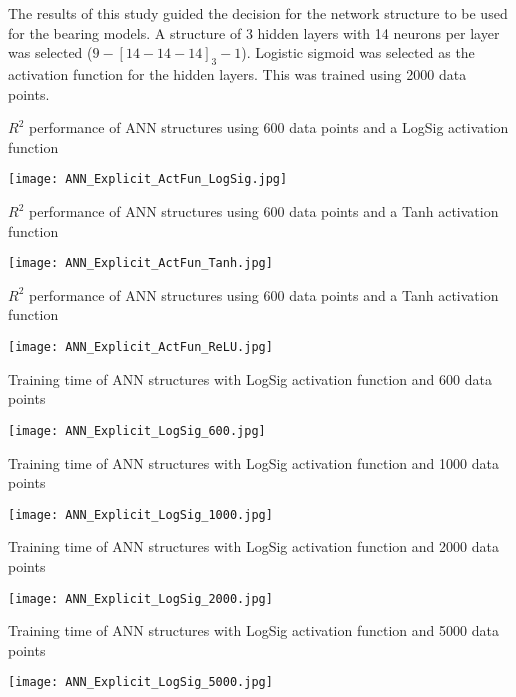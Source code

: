 The results of this study guided the decision for the network structure to be used for the bearing models. A structure of 3 hidden layers with 14 neurons per layer was selected ($9-[14-14-14]_3-1$). Logistic sigmoid was selected as the activation function for the hidden layers. This was trained using 2000 data points.

\begin{table}
	\caption{$R^2$ performance of ANN structures using 600 data points and a LogSig activation function}
	\label{LogSig_table}
	\texttt{[image: ANN\_Explicit\_ActFun\_LogSig.jpg]}
\end{table}

\begin{table}
	\caption{$R^2$ performance of ANN structures using 600 data points and a Tanh activation function}
	\label{Tanh_table}
	\texttt{[image: ANN\_Explicit\_ActFun\_Tanh.jpg]}
\end{table}

\begin{table}
	\caption{$R^2$ performance of ANN structures using 600 data points and a Tanh activation function}
	\label{ReLU_table}
	\texttt{[image: ANN\_Explicit\_ActFun\_ReLU.jpg]}
\end{table}

\begin{table}
	\caption{Training time of ANN structures with LogSig activation function and 600 data points}
	\label{ANN_Explicit_LogSig_600_table}
	\texttt{[image: ANN\_Explicit\_LogSig\_600.jpg]}
\end{table}

\begin{table}
	\caption{Training time of ANN structures with LogSig activation function and 1000 data points}
	\label{ANN_Explicit_LogSig_1000_table}
	\texttt{[image: ANN\_Explicit\_LogSig\_1000.jpg]}
\end{table}

\begin{table}
	\caption{Training time of ANN structures with LogSig activation function and 2000 data points}
	\label{ANN_Explicit_LogSig_2000_table}
	\texttt{[image: ANN\_Explicit\_LogSig\_2000.jpg]}
\end{table}

\begin{table}
	\caption{Training time of ANN structures with LogSig activation function and 5000 data points}
	\label{ANN_Explicit_LogSig_5000_table}
	\texttt{[image: ANN\_Explicit\_LogSig\_5000.jpg]}
\end{table}

